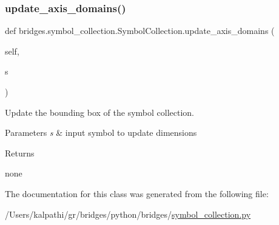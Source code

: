 \subsubsection{\texorpdfstring{update\_axis\_domains()}{update\_axis\_domains()}}
{\footnotesize\ttfamily def bridges.\+symbol\+\_\+collection.\+Symbol\+Collection.\+update\+\_\+axis\+\_\+domains (\begin{DoxyParamCaption}\item[{}]{self,  }\item[{}]{s }\end{DoxyParamCaption})}



Update the bounding box of the symbol collection. 


\begin{DoxyParams}{Parameters}
{\em s} & input symbol to update dimensions \\
\hline
\end{DoxyParams}
\begin{DoxyReturn}{Returns}


none 
\end{DoxyReturn}


The documentation for this class was generated from the following file\+:\begin{DoxyCompactItemize}
\item 
/\+Users/kalpathi/gr/bridges/python/bridges/\mbox{\hyperlink{symbol__collection_8py}{symbol\+\_\+collection.\+py}}\end{DoxyCompactItemize}
